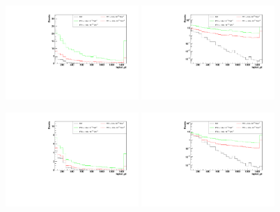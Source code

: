 \begin{figure}[h]
  \begin{center}
	\includegraphics[width=0.45\textwidth]{Plots/aQGC_kinematics/lepton_pt_FT1.pdf}%
	\includegraphics[width=0.45\textwidth]{Plots/aQGC_kinematics/lepton_pt_FT1_log.pdf}\\				
    \caption{}
  \end{center}
\end{figure}

\begin{figure}[h]
  \begin{center}
	\includegraphics[width=0.45\textwidth]{Plots/aQGC_kinematics/lepton_pt_FT2.pdf}%
	\includegraphics[width=0.45\textwidth]{Plots/aQGC_kinematics/lepton_pt_FT2_log.pdf}\\				
    \caption{}
  \end{center}
\end{figure}


